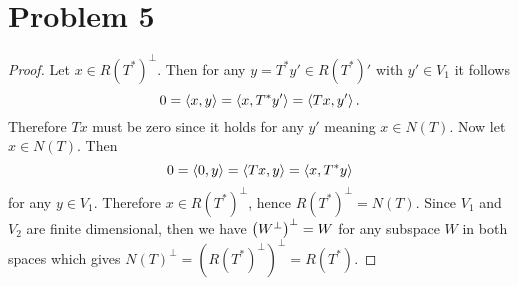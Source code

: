 \documentclass{article}
\begin{document}
\section*{Problem 5}
\begin{proof}
    Let $x \in R(T^*)^\perp$. Then for any $y = T^* y' \in R(T^*)'$ with $y' \in V_1$ it follows
    \[
        0 = \iprd{x,y} = \iprd{x, T^* y'} = \iprd{Tx, y'}
    .\]
    Therefore $Tx$ must be zero since it holds for any $y'$ meaning $x \in N(T)$. Now let $x \in N(T)$. Then
    \[
        0 = \iprd{0, y} = \iprd{Tx, y} = \iprd{x, T^* y}
    \]
    for any $y \in V_1$. Therefore $x \in R(T^*)^\perp$, hence $R(T^*)^\perp = N(T)$. Since $V_1$ and $V_2$ are finite dimensional, then we have $\qty(W^\perp)^\perp = W$ for any subspace $W$ in both spaces which gives $N(T)^\perp = (R(T^*)^\perp)^\perp = R(T^*)$.
\end{proof}
\end{document}
